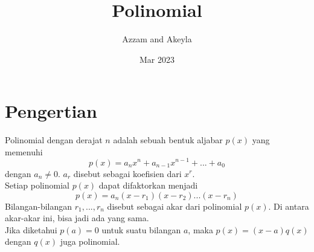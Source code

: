 \documentclass[11pt]{scrartcl}
\begin{document}
\title{Polinomial}
\author{Azzam and Akeyla}
\date{Mar 2023}
\maketitle

\renewcommand*\contentsname{Daftar Isi}
\tableofcontents

\newpage

\section{Pengertian}
Polinomial dengan derajat $n$ adalah sebuah bentuk aljabar $p(x)$ yang memenuhi $$p(x) = a_nx^n + a_{n - 1}x^{n - 1} + ... + a_0$$ dengan $a_n \neq 0$. $a_r$ disebut sebagai koefisien dari $x^r$.\\
Setiap polinomial $p(x)$ dapat difaktorkan menjadi $$p(x) = a_n(x-r_1)(x-r_2)...(x-r_n)$$Bilangan-bilangan $r_1, ..., r_n$ disebut sebagai akar dari polinomial $p(x)$. Di antara akar-akar ini, bisa jadi ada yang sama.\\
Jika diketahui $p(a) = 0$ untuk suatu bilangan $a$, maka $p(x) = (x - a)q(x)$ dengan $q(x)$ juga polinomial.\\
\end{document}
